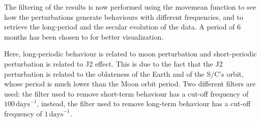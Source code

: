The filtering of the results is now performed using the movemean function to see how the perturbations generate behaviours with different frequencies, and to retrieve the long-period and the secular evolution of the data. A period of 6 months has been chosen to for better visualization. 



Here, long-periodic behaviour is related to moon perturbation and short-periodic perturbation is related to J2 effect. This is due to the fact that the J2 perturbation is related to the oblateness of the Earth and of the S/C’s orbit, whose period is much lower than the Moon orbit period. Two different filters are used: the filter used to remove short-term behaviour has a cut-off frequency of \(100 \, \text{days}^{-1}\), instead, the filter used to remove long-term behaviour has a cut-off frequency of \(1 \, \text{days}^{-1}\).
